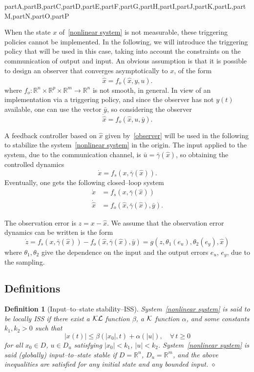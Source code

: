 \documentclass[letterpaper, 10 pt, conference]{ieeeconf}
\def\compile{partA,partB,partC,partD,partE,partF,partG,partH,partI,partJ,partK,partL,partM,partN,partO,partP}
\newenvironment{partD}[1][]{}{}  \newenvironment{partE}[1][]{}{}
\newtheorem{defin}{Definition}
\def\skp{\vskip0pt}
\newenvironment{definition}{\skp\vspace{-\lastskip}\par\addvspace{.6pc plus.2pc minus.1pc}\begin{defin}}{\hfill$\diamond$\end{defin}\par\addvspace{.6pc plus.2pc minus.1pc}\skp}
\newcommand{\R}{\mathbb{R}}
\begin{document}
\begin{xcomment}{\compile}
\begin{partC}
When the state $x$ of~\eqref{nonlinear system} is not measurable, these triggering policies cannot be implemented. In the following, we will introduce the triggering policy that will be used in this case, taking into account the constraints on the communication of output and input. An obvious assumption is that it is possible to design an observer that converges asymptotically to $x$, of the form  
$$
\dot{\hat x}=f_o(\hat x,y,u).
$$
where $f_o:\R^n\times\R^p\times\R^m\to\R^n$ is not smooth, in general. In view of an implementation via a triggering policy, and since the observer has not $y(t)$ available, one can use the vector $\bar y$, so considering the observer
\begin{equation}
\dot{\hat x}=f_o(\hat x,u,\bar y).   \label{observer}
\end{equation}

 
 
A feedback controller based on $\hat x$ given by~\eqref{observer} will be used in the following to stabilize the system~\eqref{nonlinear system} in the origin. The input applied to the system, due to the communication channel, is $\bar u=\bar\gamma(\hat x)$, so obtaining the controlled dynamics
$$
\dot x= f_s(x,\bar\gamma(\hat x)).
$$
Eventually, one gets the following closed--loop system
$$
\begin{aligned}
\dot x&= f_s(x,\bar\gamma(\hat x))                      \\
\dot{\hat x}&= f_o(\hat x,\bar\gamma(\hat x),\bar y).    
\end{aligned}
$$

The observation error is $z=x-\hat x$. We assume that the observation error dynamics can be written is the form
$$
\dot z=f_s(x,\bar\gamma(\hat x))- f_o(\hat x,\bar\gamma(\hat x),\bar y)=g(z,\theta_1(e_u),\theta_2(e_y),\hat x)
$$
where $\theta_1,\theta_2$ give the dependence on the input and the output errors $e_u$, $e_y$, due to the sampling. 


\end{partC}
\begin{partD}





\subsection{Definitions}

\begin{definition}[Input--to--state stability--ISS]
System~\eqref{nonlinear system} is said to be locally ISS if there exist a ${\cal KL}$ function $\beta$, a ${\cal K}$ function $\alpha$, and some constants $k_1,k_2>0$
such that 
$$ 
|x(t)|\le\beta(|x_0|,t)+\alpha(|u|),\quad \forall\, t\ge0
$$ 
for all $x_0\in D$, $u\in D_u$ satisfying $|x_0|<k_1$, $|u|<k_2$. System~\eqref{nonlinear system} is said (globally) input--to--state stable if $D=\R^n$, $D_u=\R^m$, and the above inequalities are satisfied for any initial state and any bounded input.
\end{definition}
\medskip





\end{partD}
\end{xcomment}
\end{document}

